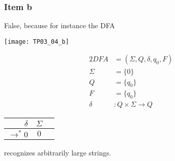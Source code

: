 {\subsubsection{Item b}
False, because for instance the DFA
\begin{center} \texttt{[image: TP03\_04\_b]} \end{center}
\begin{center}
\begin{minipage}[c]{0.25\textwidth}
	\begin{alignat*}{2}
		DFA    &= (\Sigma, Q, \delta, q_0, F)\\
		\Sigma &= \{0\}\\
		Q      &= \{q_0\}\\
		F      &= \{q_0\}\\
		\delta &\colon Q \times \Sigma \rightarrow Q
	\end{alignat*}
\end{minipage}%
\begin{minipage}[c]{0.2\textwidth}
	\begin{center}
	\begin{tabular}{ r | c c }
 		$\delta            $ & $\Sigma$ \\ \hline
 		$\rightarrow^\ast 0$ & $0     $ \\  
	\end{tabular}
	\end{center}
\end{minipage}
\end{center}
recognizes arbitrarily large strings.
\pagebreak
}
